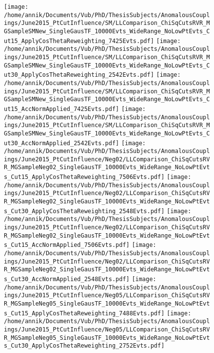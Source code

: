 \begin{figure}[h!t]
 \texttt{[image: /home/annik/Documents/Vub/PhD/ThesisSubjects/AnomalousCouplings/June2015\_PtCutInfluence/SM/LLComparison\_ChiSqCutsRVR\_MGSampleSMNew\_SingleGausTF\_10000Evts\_WideRange\_NoLowPtEvts\_Cut15\_ApplyCosThetaReweighting\_7425Evts.pdf]}
 \texttt{[image: /home/annik/Documents/Vub/PhD/ThesisSubjects/AnomalousCouplings/June2015\_PtCutInfluence/SM/LLComparison\_ChiSqCutsRVR\_MGSampleSMNew\_SingleGausTF\_10000Evts\_WideRange\_NoLowPtEvts\_Cut30\_ApplyCosThetaReweighting\_2542Evts.pdf]}
 \texttt{[image: /home/annik/Documents/Vub/PhD/ThesisSubjects/AnomalousCouplings/June2015\_PtCutInfluence/SM/LLComparison\_ChiSqCutsRVR\_MGSampleSMNew\_SingleGausTF\_10000Evts\_WideRange\_NoLowPtEvts\_Cut15\_AccNormApplied\_7425Evts.pdf]}
 \texttt{[image: /home/annik/Documents/Vub/PhD/ThesisSubjects/AnomalousCouplings/June2015\_PtCutInfluence/SM/LLComparison\_ChiSqCutsRVR\_MGSampleSMNew\_SingleGausTF\_10000Evts\_WideRange\_NoLowPtEvts\_Cut30\_AccNormApplied\_2542Evts.pdf]}
 \texttt{[image: /home/annik/Documents/Vub/PhD/ThesisSubjects/AnomalousCouplings/June2015\_PtCutInfluence/Neg02/LLComparison\_ChiSqCutsRVR\_MGSampleNeg02\_SingleGausTF\_10000Evts\_WideRange\_NoLowPtEvts\_Cut15\_ApplyCosThetaReweighting\_7506Evts.pdf]}
 \texttt{[image: /home/annik/Documents/Vub/PhD/ThesisSubjects/AnomalousCouplings/June2015\_PtCutInfluence/Neg02/LLComparison\_ChiSqCutsRVR\_MGSampleNeg02\_SingleGausTF\_10000Evts\_WideRange\_NoLowPtEvts\_Cut30\_ApplyCosThetaReweighting\_2548Evts.pdf]}
 \texttt{[image: /home/annik/Documents/Vub/PhD/ThesisSubjects/AnomalousCouplings/June2015\_PtCutInfluence/Neg02/LLComparison\_ChiSqCutsRVR\_MGSampleNeg02\_SingleGausTF\_10000Evts\_WideRange\_NoLowPtEvts\_Cut15\_AccNormApplied\_7506Evts.pdf]}
 \texttt{[image: /home/annik/Documents/Vub/PhD/ThesisSubjects/AnomalousCouplings/June2015\_PtCutInfluence/Neg02/LLComparison\_ChiSqCutsRVR\_MGSampleNeg02\_SingleGausTF\_10000Evts\_WideRange\_NoLowPtEvts\_Cut30\_AccNormApplied\_2548Evts.pdf]}
 \texttt{[image: /home/annik/Documents/Vub/PhD/ThesisSubjects/AnomalousCouplings/June2015\_PtCutInfluence/Neg05/LLComparison\_ChiSqCutsRVR\_MGSampleNeg05\_SingleGausTF\_10000Evts\_WideRange\_NoLowPtEvts\_Cut15\_ApplyCosThetaReweighting\_7488Evts.pdf]}
 \texttt{[image: /home/annik/Documents/Vub/PhD/ThesisSubjects/AnomalousCouplings/June2015\_PtCutInfluence/Neg05/LLComparison\_ChiSqCutsRVR\_MGSampleNeg05\_SingleGausTF\_10000Evts\_WideRange\_NoLowPtEvts\_Cut30\_ApplyCosThetaReweighting\_2752Evts.pdf]}

\end{figure}
